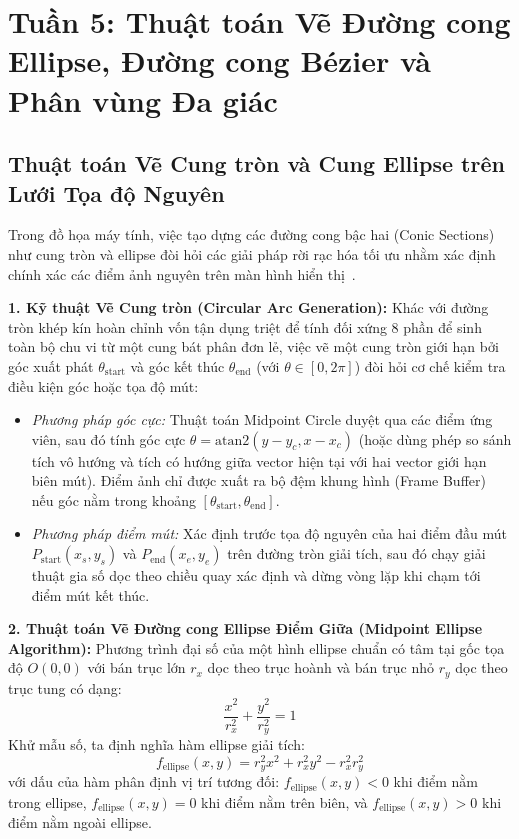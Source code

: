 \section{Tuần 5: Thuật toán Vẽ Đường cong Ellipse, Đường cong Bézier và Phân vùng Đa giác}
\label{sec:week5}

\subsection{Thuật toán Vẽ Cung tròn và Cung Ellipse trên Lưới Tọa độ Nguyên}
\label{subsec:w5_arc}

Trong đồ họa máy tính, việc tạo dựng các đường cong bậc hai (Conic Sections) như cung tròn và ellipse đòi hỏi các giải pháp rời rạc hóa tối ưu nhằm xác định chính xác các điểm ảnh nguyên trên màn hình hiển thị~\citep{hearn2004computer,foley1996computer}.

\textbf{1. Kỹ thuật Vẽ Cung tròn (Circular Arc Generation):}
Khác với đường tròn khép kín hoàn chỉnh vốn tận dụng triệt để tính đối xứng 8 phần để sinh toàn bộ chu vi từ một cung bát phân đơn lẻ, việc vẽ một cung tròn giới hạn bởi góc xuất phát $\theta_{\text{start}}$ và góc kết thúc $\theta_{\text{end}}$ (với $\theta \in [0, 2\pi]$) đòi hỏi cơ chế kiểm tra điều kiện góc hoặc tọa độ mút:
\begin{itemize}
    \item \textit{Phương pháp góc cực:} Thuật toán Midpoint Circle duyệt qua các điểm ứng viên, sau đó tính góc cực $\theta = \text{atan2}(y - y_c, x - x_c)$ (hoặc dùng phép so sánh tích vô hướng và tích có hướng giữa vector hiện tại với hai vector giới hạn biên mút). Điểm ảnh chỉ được xuất ra bộ đệm khung hình (Frame Buffer) nếu góc nằm trong khoảng $[\theta_{\text{start}}, \theta_{\text{end}}]$.
    \item \textit{Phương pháp điểm mút:} Xác định trước tọa độ nguyên của hai điểm đầu mút $P_{\text{start}}(x_s, y_s)$ và $P_{\text{end}}(x_e, y_e)$ trên đường tròn giải tích, sau đó chạy giải thuật gia số dọc theo chiều quay xác định và dừng vòng lặp khi chạm tới điểm mút kết thúc.
\end{itemize}

\textbf{2. Thuật toán Vẽ Đường cong Ellipse Điểm Giữa (Midpoint Ellipse Algorithm):}
Phương trình đại số của một hình ellipse chuẩn có tâm tại gốc tọa độ $O(0, 0)$ với bán trục lớn $r_x$ dọc theo trục hoành và bán trục nhỏ $r_y$ dọc theo trục tung có dạng:
\begin{equation}
\frac{x^2}{r_x^2} + \frac{y^2}{r_y^2} = 1
\end{equation}
Khử mẫu số, ta định nghĩa hàm ellipse giải tích:
\begin{equation}
f_{\text{ellipse}}(x, y) = r_y^2 x^2 + r_x^2 y^2 - r_x^2 r_y^2
\end{equation}
với dấu của hàm phân định vị trí tương đối: $f_{\text{ellipse}}(x, y) < 0$ khi điểm nằm trong ellipse, $f_{\text{ellipse}}(x, y) = 0$ khi điểm nằm trên biên, và $f_{\text{ellipse}}(x, y) > 0$ khi điểm nằm ngoài ellipse.

